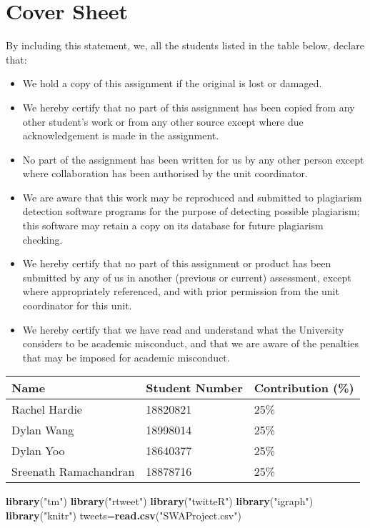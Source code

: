 \documentclass[]{article}
\title{}
\author{}
\date{}
\newenvironment{Shaded}{\begin{snugshade}}{\end{snugshade}}
\newcommand{\KeywordTok}[1]{\textcolor[rgb]{0.13,0.29,0.53}{\textbf{#1}}}
\newcommand{\StringTok}[1]{\textcolor[rgb]{0.31,0.60,0.02}{#1}}
\newcommand{\NormalTok}[1]{#1}
\begin{document}
\section{Cover Sheet}\label{cover-sheet}

By including this statement, we, all the students listed in the table
below, declare that:

\begin{itemize}
\item
  We hold a copy of this assignment if the original is lost or damaged.
\item
  We hereby certify that no part of this assignment has been copied from
  any other student's work or from any other source except where due
  acknowledgement is made in the assignment.
\item
  No part of the assignment has been written for us by any other person
  except where collaboration has been authorised by the unit
  coordinator.
\item
  We are aware that this work may be reproduced and submitted to
  plagiarism detection software programs for the purpose of detecting
  possible plagiarism; this software may retain a copy on its database
  for future plagiarism checking.
\item
  We hereby certify that no part of this assignment or product has been
  submitted by any of us in another (previous or current) assessment,
  except where appropriately referenced, and with prior permission from
  the unit coordinator for this unit.
\item
  We hereby certify that we have read and understand what the University
  considers to be academic misconduct, and that we are aware of the
  penalties that may be imposed for academic misconduct.
\end{itemize}

\begin{longtable}[]{@{}lll@{}}
\toprule
Name & Student Number & Contribution (\%)\tabularnewline
\midrule
\endhead
Rachel Hardie & 18820821 & 25\%\tabularnewline
Dylan Wang & 18998014 & 25\%\tabularnewline
Dylan Yoo & 18640377 & 25\%\tabularnewline
Sreenath Ramachandran & 18878716 & 25\%\tabularnewline
\bottomrule
\end{longtable}

\begin{Shaded}
\begin{Highlighting}[]
\KeywordTok{library}\NormalTok{(}\StringTok{"tm"}\NormalTok{)}
\KeywordTok{library}\NormalTok{(}\StringTok{"rtweet"}\NormalTok{)}
\KeywordTok{library}\NormalTok{(}\StringTok{"twitteR"}\NormalTok{)}
\KeywordTok{library}\NormalTok{(}\StringTok{"igraph"}\NormalTok{)}
\KeywordTok{library}\NormalTok{(}\StringTok{"knitr"}\NormalTok{)}
\NormalTok{tweets=}\KeywordTok{read.csv}\NormalTok{(}\StringTok{"SWAProject.csv"}\NormalTok{)}
\end{Highlighting}
\end{Shaded}
\end{document}
